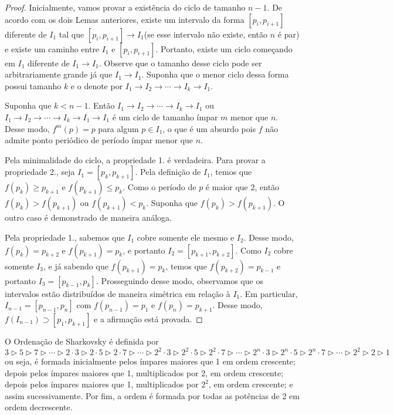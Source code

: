 \begin{proof}
Inicialmente, vamos provar a existência do ciclo de tamanho $n-1$. De acordo com os dois Lemas anteriores, existe um intervalo da forma $[p_i, p_{i+1}]$ diferente de $I_1$ tal que $[p_i, p_{i+1}] \longrightarrow I_1$(se esse intervalo não existe, então $n$ é par) e existe um caminho entre $I_1$ e $[p_i, p_{i+1}]$. Portanto, existe um ciclo começando em $I_1$ diferente de $I_1 \longrightarrow I_1$. Observe que o tamanho desse ciclo pode ser arbitrariamente grande já que $I_1 \longrightarrow I_1$. Suponha que o menor ciclo dessa forma possui tamanho $k$ e o denote por $I_1 \longrightarrow I_2 \longrightarrow \cdots \longrightarrow I_k \longrightarrow I_1$.

Suponha que $k < n-1$. Então $I_1 \longrightarrow I_2 \longrightarrow \cdots \longrightarrow I_k \longrightarrow I_1$ ou $I_1 \longrightarrow I_2 \longrightarrow \cdots \longrightarrow I_k \longrightarrow I_1 \longrightarrow I_1$ é um ciclo de tamanho ímpar $m$ menor que $n$. Desse modo, $f^m(p) = p$ para algum $p \in I_1$, o que é um absurdo pois $f$ não admite ponto periódico de período ímpar menor que $n$.

Pela minimalidade do ciclo, a propriedade 1. é verdadeira. Para provar a propriedade 2., seja $I_1 = [p_k, p_{k+1}]$. Pela definição de $I_1$, temos que $f(p_k) \geq p_{k+1}$ e $f(p_{k+1}) \leq p_k$. Como o período de $p$ é maior que 2, então $f(p_k) > f(p_{k+1})$ ou $f(p_{k+1}) < p_k$. Suponha que  $f(p_k) > f(p_{k+1})$. O outro caso é demonstrado de maneira análoga.

Pela propriedade 1., sabemos que $I_1$ cobre somente ele mesmo e $I_2$. Desse modo, $f(p_k) = p_{k+2}$ e $f(p_{k+1}) = p_k$, e portanto $I_2 = [p_{k+1}, p_{k+2}]$. Como $I_2$ cobre somente $I_3$, e já sabendo que $f(p_{k+1}) = p_k$, temos que $f(p_{k+2}) = p_{k-1}$ e portanto $I_3 = [p_{k-1}, p_k]$. Prosseguindo desse modo, observamos que os intervalos estão distribuídos de maneira simétrica em relação à $I_1$. Em particular, $I_{n-1} = [p_{n-1}, p_n]$ com $f(p_{n-1}) = p_1$ e $f(p_n) = p_{k+1}$. Desse modo, $f(I_{n-1}) \supset [p_1, p_{k+1}]$ e a afirmação está provada.
\end{proof}

\begin{definition}
O Ordenação de Sharkovsky é definida por
$$3 \triangleright 5 \triangleright 7 \triangleright \cdots
\triangleright 2 \cdot 3 \triangleright 2 \cdot 5 \triangleright 2 \cdot 7 \triangleright \cdots
\triangleright 2^2 \cdot 3 \triangleright 2^2 \cdot 5 \triangleright 2^2 \cdot 7 \triangleright \cdots
\triangleright 2^n \cdot 3 \triangleright 2^n \cdot 5 \triangleright 2^n \cdot 7 \triangleright \cdots
\triangleright 2^2 \triangleright 2 \triangleright 1$$
ou seja, é formada inicialmente pelos ímpares maiores que 1 em ordem crescente; depois pelos ímpares maiores que 1, multiplicados por 2, em ordem crescente; depois pelos ímpares maiores que 1, multiplicados por $2^2$, em ordem crescente; e assim sucessivamente. Por fim, a ordem é formada por todas as potências de 2 em ordem decrescente.
\end{definition}

